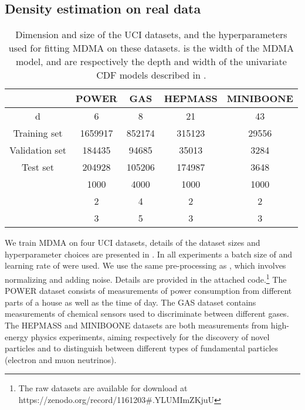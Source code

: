 \documentclass{article}
\begin{document}
\subsection{Density estimation on real data}

\begin{table}[]
\caption{Dimension and size of the UCI datasets, and the hyperparameters used for fitting MDMA on these datasets.  is the width of the MDMA model,  and  are respectively the depth and width of the univariate CDF models described in . \label{tab:UCI_details} }
\centering 
\begin{tabular}{ccccc}
\toprule
 & POWER   & GAS & HEPMASS & MINIBOONE\\ \hline
d                                               & 6       & 8   & 21      & 43        \\
Training set                                    & 1659917 & 852174                  & 315123                      & 29556                         \\
Validation set                                  & 184435  & 94685                   & 35013                       & 3284                          \\
Test set                                        & 204928  & 105206                  & 174987                      & 3648   \\    \hline
 & 1000 & 4000 & 1000 & 1000 \\ 
 & 2 & 4 & 2 & 2 
\\ 
 & 3 & 5 & 3 & 3
\\
\bottomrule
\end{tabular}
\end{table}

We train MDMA on four UCI datasets, details of the dataset sizes and hyperparameter choices are presented in . In all experiments a batch size of  and learning rate of  were used. We use the same pre-processing as \cite{papamakarios2017masked}, which involves normalizing and adding noise. Details are provided in the attached code.\footnote{The raw datasets are available for download at https://zenodo.org/record/1161203\#.YLUMImZKjuU} The POWER dataset consists of measurements of power consumption from different parts of a house as well as the time of day. The GAS dataset contains measurements of chemical sensors used to discriminate between different gases. The HEPMASS and MINIBOONE datasets are both measurements from high-energy physics experiments, aiming respectively for the discovery of novel particles and to distinguish between different types of fundamental particles (electron and muon neutrinos). 
\end{document}
